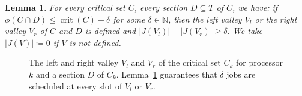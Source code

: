 \documentclass[a4paper]{article}
\DeclareMathOperator{\crit}{crit}
\newtheorem{lemma}[theorem]{Lemma}
\begin{document}
\begin{lemma}\label{lemma:valley}
  For every critical set $C$, every section $D \subseteq T$ of $C$, we have: if $\phi(C \cap D) \leq \crit(C) - \delta$ for some $\delta \in \mathbb{N}$, then the left valley $V_l$ or the right valley $V_r$ of $C$ and $D$ is defined and $|J(V_l)| + |J(V_r)| \geq \delta$.
  We take $|J(V)| \coloneqq 0$ if $V$ is not defined.
\end{lemma}
\begin{figure}
  \centering
  
  \caption{The left and right valley $V_l$ and $V_r$ of the critical set $C_k$ for processor $k$ and a section $D$ of $C_k$.
  Lemma~\ref{lemma:valley} guarantees that $\delta$ jobs are scheduled at every slot of $V_l$ or $V_r$.}\label{fig:left_right_valleys}
\end{figure}
\end{document}
